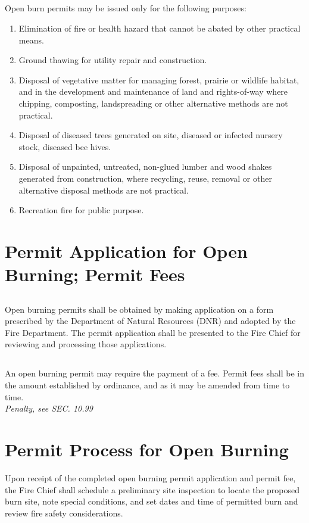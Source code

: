 \documentclass[code.tex]{subfiles}
\begin{document}
\subsection{}
Open burn permits may be issued only for the following purposes:
\begin{enumerate}[{\indent}1)]
    \item Elimination of fire or health hazard that cannot be abated by other practical means.
    \item Ground thawing for utility repair and construction.
    \item Disposal of vegetative matter for managing forest, prairie or wildlife habitat, and in the development and maintenance of land and rights-of-way where chipping, composting, landspreading or other alternative methods are not practical.
    \item Disposal of diseased trees generated on site, diseased or infected nursery stock, diseased bee hives.
    \item Disposal of unpainted, untreated, non-glued lumber and wood shakes generated from construction, where recycling, reuse, removal or other alternative disposal methods are not practical.
    \item Recreation fire for public purpose.
\end{enumerate}
\section{Permit Application for Open Burning; Permit Fees}
\subsection{}
Open burning permits shall be obtained by making application on a form prescribed by the Department of Natural Resources (DNR) and adopted by the Fire Department.  The permit application shall be presented to the Fire Chief for reviewing and processing those applications.
\subsection{}
An open burning permit may require the payment of a fee.  Permit fees shall be in the amount established by ordinance, and as it may be amended from time to time.\\
\emph{Penalty, see SEC. 10.99}
\section{Permit Process for Open Burning}
Upon receipt of the completed open burning permit application and permit fee, the Fire Chief shall schedule a preliminary site inspection to locate the proposed burn site, note special conditions, and set dates and time of permitted burn and review fire safety considerations.
\end{document}
